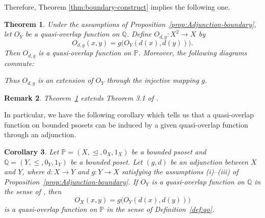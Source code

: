 \documentclass[preprint,12pt]{elsarticle}
\newtheorem{theorem}{Theorem}[section]
\newtheorem{corollary}[theorem]{Corollary}
\newtheorem{remark}[theorem]{Remark}
\begin{document}
Therefore, Theorem \ref{thm:boundary-construct} implies the following one.
\begin{theorem}\label{thm:Adjunction-qo}
Under the assumptions of Proposition~\ref{prop:Adjunction-boundary}, let $O_Y$ be a quasi-overlap function on $\mathbb{Q}$. Define $O_{d,g}:X^2\to X$ by
$$
 O_{d,g}(x,y)
 =
 g\bigl(O_Y(d(x),d(y))\bigr).
$$
Then $O_{d,g}$ is a quasi-overlap function on $\mathbb{P}$.
Moreover, the following diagrams commute:
\begin{center}
\qquad\qquad
{}
\end{center}
Thus $O_{d,g}$ is an extension of $O_Y$ through the injective
mapping $g$.
\end{theorem}

\begin{remark}\label{rem:galois-s}
\emph{Theorem~\ref{thm:Adjunction-qo} extends Theorem 3.1 of \cite{Qiao2022}.}
\end{remark}

In particular, we have the following corollary which tells us that a quasi-overlap function on bounded psosets can be induced by a given quasi-overlap function through an adjunction.
\begin{corollary}\label{cor:poset-to-psoset-qo}
Let $\mathbb{P}=(X,\trianglelefteq,0_X,1_X)$ be a bounded psoset and $\mathbb{Q}=(Y,\leq,0_Y,1_Y)$ be a bounded poset. Let $(g,d)$ be an adjunction between $X$ and $Y$, where $d:X\to Y$ and $g:Y\to X$ satisfying the assumptions (i)--(iii) of Proposition~\ref{prop:Adjunction-boundary}. If $O_Y$ is a quasi-overlap function on $\mathbb{Q}$ in the sense of \cite{Qiao2022}, then
$$
 O_X(x,y)
 =
 g\bigl(O_Y(d(x),d(y))\bigr)
$$
is a quasi-overlap function on $\mathbb{P}$ in the sense of Definition~\ref{def:qo}.
\end{corollary}
\end{document}
